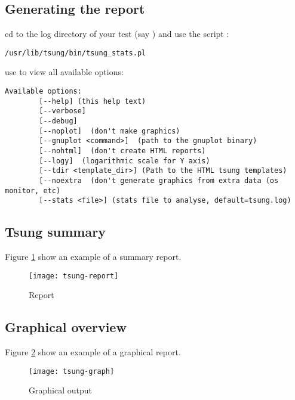 \documentclass{IDXDOC-en}
\begin{document}
\subsection{Generating the report}

cd to the log directory of your test (say
) and use the script
:

\begin{Verbatim}
/usr/lib/tsung/bin/tsung_stats.pl
\end{Verbatim}


use  to view all available options:

\begin{Verbatim}
Available options:
        [--help] (this help text)
        [--verbose]
        [--debug]
        [--noplot]  (don't make graphics)
        [--gnuplot <command>]  (path to the gnuplot binary)
        [--nohtml]  (don't create HTML reports)
        [--logy]  (logarithmic scale for Y axis)
        [--tdir <template_dir>] (Path to the HTML tsung templates)
        [--noextra  (don't generate graphics from extra data (os monitor, etc)
        [--stats <file>] (stats file to analyse, default=tsung.log)
\end{Verbatim}

\subsection{Tsung summary}
Figure \ref{fig:report} show an example of a summary report.
\begin{figure}[htb]
  \begin{center}
    \texttt{[image: tsung-report]}
    \end{center}
      \caption{Report}
    \label{fig:report}
\end{figure}

\subsection{Graphical overview}

Figure \ref{fig:graph} show an example of a graphical report.

\begin{figure}[htb]
  \begin{center}
    \texttt{[image: tsung-graph]}
    \end{center}
      \caption{Graphical output}
    \label{fig:graph}
\end{figure}
\end{document}
